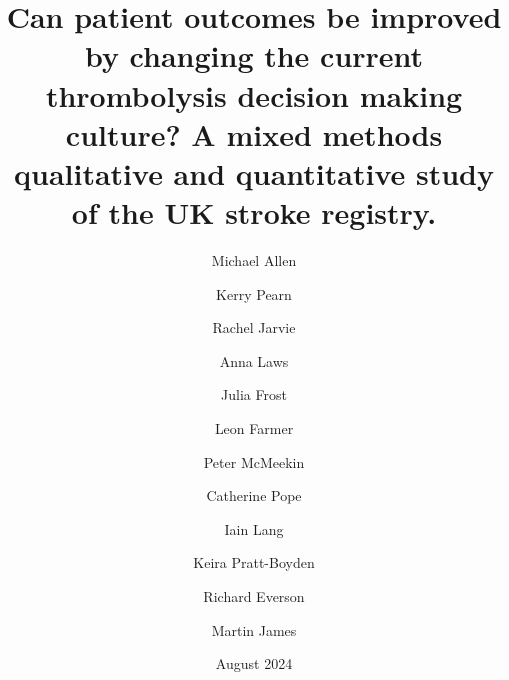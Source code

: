 \title{Can patient outcomes be improved by changing the current thrombolysis decision making culture? A mixed methods qualitative and quantitative study of the UK stroke registry.}
\date{August 2024}

\renewcommand{\thefootnote}{\fnsymbol{footnote}}

\author[*1,2]{Michael Allen}
\author[1,2]{Kerry Pearn}
\author[1]{Rachel Jarvie}
\author[1]{Anna Laws}
\author[1]{Julia Frost}
\author[1]{Leon Farmer}
\author[3]{Peter McMeekin}
\author[4]{Catherine Pope}
\author[1]{Iain Lang}
\author[1]{Keira Pratt-Boyden}
\author[1]{Richard Everson}
\author[1,5]{Martin James}

